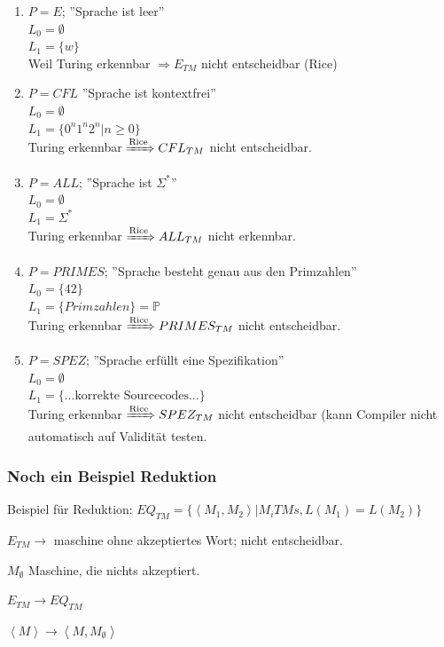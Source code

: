 \begin{enumerate}
	\item $P=E$; ''Sprache ist leer''\\
		$L_0 = \emptyset$ \\
		$L_1 = \{w\}$ \\
		Weil Turing erkennbar $\Rightarrow E_{TM}$ nicht entscheidbar (Rice)
	\item $P = CFL$ ''Sprache ist kontextfrei'' \\
		$L_0 = \emptyset$ \\
		$L_1 = \{0^n1^n2^n | n \geq 0\}$ \\
		Turing erkennbar $\xRightarrow{\text{Rice}} CFL_{TM}$ nicht entscheidbar.
	\item $P = ALL$; ''Sprache ist $\Sigma^\ast$'' \\
		$L_0 = \emptyset$ \\
		$L_1 = \Sigma^\ast$ \\
		Turing erkennbar $\xRightarrow{\text{Rice}} ALL_{TM}$ nicht erkennbar.
	\item $P = PRIMES$; ''Sprache besteht genau aus den Primzahlen'' \\
		$L_0 = \{ 42 \}$ \\
		$L_1 = \{Primzahlen\} = \mathbb{P}$ \\
		Turing erkennbar $\xRightarrow{\text{Rice}} PRIMES_{TM}$ nicht entscheidbar.
	\item $P = SPEZ$; ''Sprache erfüllt eine Spezifikation'' \\
		$L_0 = \emptyset$ \\
		$L_1 = \{...\text{korrekte Sourcecodes}...\}$ \\
		Turing erkennbar $\xRightarrow{\text{Rice}} SPEZ_{TM}$ nicht entscheidbar (kann Compiler nicht automatisch auf Validität testen.
\end{enumerate}

\subsubsection{Noch ein Beispiel Reduktion}


Beispiel für Reduktion: $EQ_{TM} = \{\left<M_1,M_2\right> | M_i TMs, L(M_1) = L(M_2) \}$

$E_{TM} \rightarrow$ maschine ohne akzeptiertes Wort; nicht entscheidbar.

$M_\emptyset$ Maschine, die nichts akzeptiert.

$E_{TM} \longrightarrow EQ_{TM} $

$ \left<M\right> \longrightarrow \left<M, M_\emptyset\right>$

